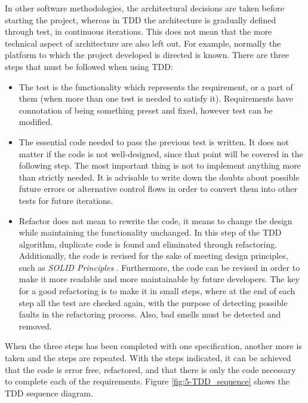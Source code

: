 In other software methodologies, the architectural decisions are taken before starting the project, whereas in \ac{TDD} the architecture is gradually defined through test, in continuous iterations. This does not mean that the more technical aspect of architecture are also left out. For example, normally the platform to which the project developed is directed is known. There are three steps that must be followed when using \ac{TDD}:
\begin{itemize}
	\item {} The test is the functionality which represents the requirement, or a part of them (when more than one test is needed to satisfy it). Requirements have connotation of being something preset and fixed, however test can be modified. 
	
	\item {} The essential code needed to pass the previous test is written. It does not matter if the code is not well-designed, since that point will be covered in the following step. The most important thing is not to implement anything more than strictly needed. It is advisable to write down the doubts about possible future errors or alternative control flows in order to convert them into other tests for future iterations.
	
	\item {} Refactor does not mean to rewrite the code, it means to change the design while maintaining the functionality unchanged. In this step of the TDD algorithm, duplicate code is found and eliminated through refactoring. Additionally, the code is revised for the sake of meeting design principles, such as \emph{SOLID Principles} \cite{SOLIDPrinciples}. Furthermore, the code can be revised in order to make it more readable and more maintainable by future developers. The key for a good refactoring is to make it in small steps, where at the end of each step all the test are checked again, with the purpose of detecting possible faults in the refactoring process. Also, bad smells must be detected and removed. 
\end{itemize}

When the three steps has been completed with one specification, another more is taken and the steps are repeated. With the steps indicated, it can be achieved that the code is error free, refactored, and that there is only the code necessary to complete each of the requirements. Figure \ref{fig:5-TDD_sequence} shows the TDD sequence diagram.

